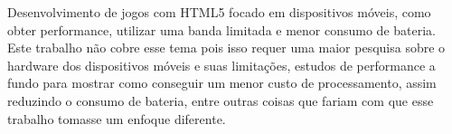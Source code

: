 Desenvolvimento de jogos com HTML5 focado em dispositivos móveis, como
obter performance, utilizar uma banda limitada e menor consumo de
bateria. Este trabalho não cobre esse tema pois isso requer uma maior
pesquisa sobre o hardware dos dispositivos móveis e suas limitações,
estudos de performance a fundo para mostrar como conseguir um menor
custo de processamento, assim reduzindo o consumo de bateria, entre
outras coisas que fariam com que esse trabalho tomasse um enfoque
diferente.
